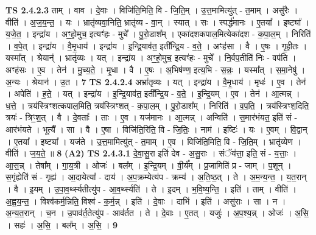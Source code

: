 \documentclass[17pt]{extarticle}
\begin{document}
                  \newline
                                \textbf{ TS 2.4.2.3} \newline
                  ताम् । वाव । दे॒वाः । विजि॑ति॒मिति॒ वि - जि॒ति॒म् । उ॒त्त॒मामित्यु॑त् - त॒माम् । असु॑रैः । वीति॑ । अ॒ज॒य॒न्त॒ । यः । भ्रातृ॑व्यवा॒निति॒ भ्रातृ॑व्य - वा॒न् । स्यात् । सः । स्पर्द्ध॑मानः । ए॒तया᳚ । इष्ट्या᳚ । य॒जे॒त॒ । इन्द्रा॑य । अꣳ॒॒हो॒मुच॒ इत्यꣳ॑हः - मुचे᳚ । पु॒रो॒डाश᳚म् । एका॑दशकपाल॒मित्येका॑दश - क॒पा॒ल॒म् । निरिति॑ । व॒पे॒त् । इन्द्रा॑य । वै॒मृ॒धाय॑ । इन्द्रा॑य । इ॒न्द्रि॒याव॑त॒ इती᳚न्द्रि॒य - व॒ते॒ । अꣳह॑सा । वै । ए॒षः । गृ॒ही॒तः । यस्मा᳚त् । श्रेयान्॑ । भ्रातृ॑व्यः । यत् । इन्द्रा॑य । अꣳ॒॒हो॒मुच॒ इत्यꣳ॑हः - मुचे᳚ । नि॒र्वप॒तीति॑ निः - वप॑ति । अꣳह॑सः । ए॒व । तेन॑ । मु॒च्य॒ते॒ । मृ॒धा । वै । ए॒षः । अ॒भिष॑ण्ण॒ इत्य॒भि - स॒न्नः॒ । यस्मा᳚त् । स॒मा॒नेषु॑ । अ॒न्यः । श्रेयान॑ । उ॒त । \textbf{  7} \newline
                  \newline
                                \textbf{ TS 2.4.2.4} \newline
                  अभ्रा॑तृव्यः । यत् । इन्द्रा॑य । वै॒मृ॒धाय॑ । मृधः॑ । ए॒व । तेन॑ । अपेति॑ । ह॒ते॒ । यत् । इन्द्रा॑य । इ॒न्द्रि॒याव॑त॒ इती᳚न्द्रि॒य - व॒ते॒ । इ॒न्द्रि॒यम् । ए॒व । तेन॑ । आ॒त्मन्न् । ध॒त्ते॒ । त्रय॑स्त्रिꣳशत्कपाल॒मिति॒ त्रय॑स्त्रिꣳशत् - क॒पा॒ल॒म् । पु॒रो॒डाश᳚म् । निरिति॑ । व॒प॒ति॒ । त्रय॑स्त्रिꣳश॒दिति॒ त्रयः॑ - त्रिꣳ॒॒श॒त् । वै । दे॒वताः᳚ । ताः । ए॒व । यज॑मानः । आ॒त्मन्न् । अन्विति॑ । स॒मार॑भंयत॒ इति॑ सं - आर॑भंयते । भूत्यै᳚ । सा । वै । ए॒षा । विजि॑ति॒रिति॒ वि - जि॒तिः॒ । नाम॑ । इष्टिः॑ । यः । ए॒वम् । वि॒द्वान् । ए॒तया᳚ । इष्ट्या᳚ । यज॑ते । उ॒त्त॒मामित्यु॑त् - त॒माम् । ए॒व । विजि॑ति॒मिति॒ वि - जि॒ति॒म् । भ्रातृ॑व्येण । वीति॑ । ज॒य॒ते॒ ॥ \textbf{  8} \newline
                  \newline
                       \textbf{(A2)} \newline \newline
                                \textbf{ TS 2.4.3.1} \newline
                  दे॒वा॒सु॒रा इति॑ देव - अ॒सु॒राः । संॅय॑त्ता॒ इति॒ सं - य॒त्ताः॒ । आ॒स॒न्न् । तेषा᳚म् । गा॒य॒त्री । ओजः॑ । बल᳚म् । इ॒न्द्रि॒यम् । वी॒र्य᳚म् । प्र॒जामिति॑ प्र - जाम् । प॒शून् । स॒गृंह्येति॑ सं - गृह्य॑ । आ॒दायेत्या᳚ - दाय॑ । अ॒प॒क्रम्येत्य॑प - क्रम्य॑ । अ॒ति॒ष्ठ॒त् । ते । अ॒म॒न्य॒न्त॒ । य॒त॒रान् । वै । इ॒यम् । उ॒पा॒व॒र्थ्स्यतीत्यु॑प - आ॒व॒र्थ्स्यति॑ । ते । इ॒दम् । भ॒वि॒ष्य॒न्ति॒ । इति॑ । ताम् । वीति॑ । अ॒ह्व॒य॒न्त॒ । विश्व॑कर्म॒न्निति॒ विश्व॑ - क॒र्म॒न्न् । इति॑ । दे॒वाः । दाभि॑ । इति॑ । असु॑राः । सा । न । अ॒न्य॒त॒रान् । च॒न । उ॒पाव॑र्त॒तेत्यु॑प - आव॑र्तत । ते । दे॒वाः । ए॒तत् । यजुः॑ । अ॒प॒श्य॒न्न् । ओजः॑ । अ॒सि॒ । सहः॑ । अ॒सि॒ । बल᳚म् । अ॒सि॒ । \textbf{  9} \newline
\end{document}
